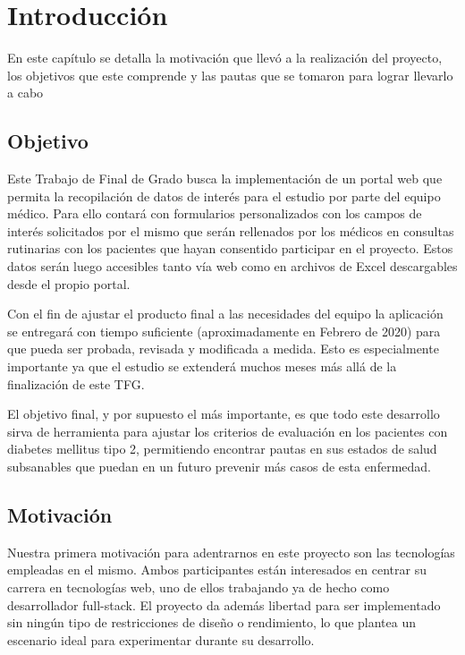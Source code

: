 \chapter{Introducción}
 En este capítulo se detalla la motivación que llevó a la realización del proyecto, los objetivos que este comprende y las pautas que se tomaron para lograr llevarlo a cabo
    
    \section{Objetivo}
    
    Este Trabajo de Final de Grado busca la implementación de un portal web que permita la recopilación de datos de interés para el estudio por parte del equipo médico. Para ello contará con formularios personalizados con los campos de interés  solicitados por el mismo que serán rellenados por los médicos en consultas rutinarias con los pacientes que hayan consentido participar en el proyecto. Estos datos serán luego accesibles tanto vía web como en archivos de Excel descargables desde el propio portal.\newline

	Con el fin de ajustar el producto final a las necesidades del equipo la aplicación se entregará con tiempo suficiente (aproximadamente en Febrero de 2020) para que pueda ser probada, revisada y modificada a medida. Esto es especialmente importante ya que el estudio se extenderá muchos meses más allá de la finalización de este TFG.\newline

	El objetivo final, y por supuesto el más importante, es que todo este desarrollo sirva de herramienta para ajustar los criterios de evaluación en los pacientes con diabetes mellitus tipo 2, permitiendo encontrar pautas en sus estados de salud subsanables que puedan en un futuro prevenir más casos de esta enfermedad.\newpage
	
	\section{Motivación}
    
    Nuestra primera motivación para adentrarnos en este proyecto son las tecnologías empleadas en el mismo. Ambos participantes están interesados en centrar su carrera en tecnologías web, uno de ellos trabajando ya de hecho como desarrollador full-stack. El proyecto da además libertad para ser implementado sin ningún tipo de restricciones de diseño o rendimiento, lo que plantea un escenario ideal para experimentar durante su desarrollo.\newline

